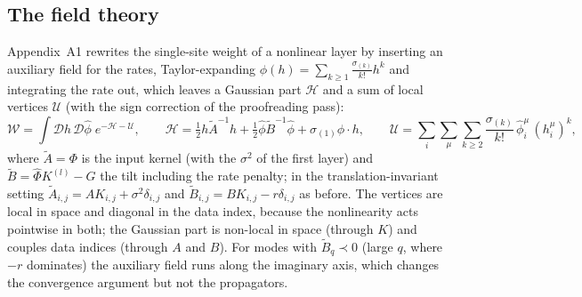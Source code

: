 \documentclass[11pt,a4paper]{article}
\newcommand{\D}{\mathcal D}
\newcommand{\W}{\mathcal W}
\newcommand{\At}{\tilde A}
\newcommand{\Bt}{\tilde B}
\begin{document}
\subsection{The field theory}
Appendix~A1 rewrites the single-site weight of a nonlinear layer by inserting an auxiliary field for the rates, Taylor-expanding $\phi(h) = \sum_{k\ge1}\frac{\sigma_{(k)}}{k!}h^k$ and integrating the rate out, which leaves a Gaussian part $\mathcal H$ and a sum of local vertices $\mathcal U$ (with the sign correction of the proofreading pass):
\begin{equation}
  \W = \int\D h\,\D\hat\phi\;e^{-\mathcal H-\mathcal U},
  \qquad
  \mathcal H = \tfrac12 h\At^{-1}h + \tfrac12\hat\phi\Bt^{-1}\hat\phi + \sigma_{(1)}\hat\phi\cdot h,
  \qquad
  \mathcal U = \sum_i\sum_{\mu}\sum_{k\ge2}\frac{\sigma_{(k)}}{k!}\,\hat\phi^{\mu}_i\,(h^{\mu}_i)^k ,
  \label{eq:A1-lattice}
\end{equation}
where $\At = \Phi$ is the input kernel (with the $\sigma^2$ of the first layer) and $\Bt = \hat\Phi K^{(l)}-G$ the tilt including the rate penalty; in the translation-invariant setting $\At_{i,j} = AK_{i,j}+\sigma^2\delta_{i,j}$ and $\Bt_{i,j} = BK_{i,j}-r\delta_{i,j}$ as before. The vertices are local in space and diagonal in the data index, because the nonlinearity acts pointwise in both; the Gaussian part is non-local in space (through $K$) and couples data indices (through $A$ and $B$). For modes with $\Bt_q\prec0$ (large $q$, where $-r$ dominates) the auxiliary field runs along the imaginary axis, which changes the convergence argument but not the propagators.
\end{document}
